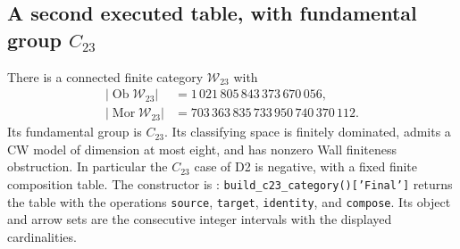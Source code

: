 \subsection{A second executed table, with fundamental group $C_{23}$}
\label{D:C23-final-table-section}

\begin{theorem}\label{D:C23-final-table}
There is a connected finite category $\mathcal W_{23}$ with
\[
\begin{split}
 |\operatorname{Ob}\mathcal W_{23}|
   &=1\,021\,805\,843\,373\,670\,056,\\
 |\operatorname{Mor}\mathcal W_{23}|
   &=703\,363\,835\,733\,950\,740\,370\,112.
\end{split}
\]
Its fundamental group is $C_{23}$. Its classifying space is finitely
dominated, admits a CW model of dimension at most eight, and has
nonzero Wall finiteness obstruction. In particular the $C_{23}$ case
of D2 is negative, with a fixed finite composition table.
The constructor is :
\texttt{build\_c23\_category()['Final']} returns the table with
the operations \texttt{source}, \texttt{target}, \texttt{identity},
and \texttt{compose}. Its object and arrow sets are the consecutive
integer intervals with the displayed cardinalities.
\end{theorem}

